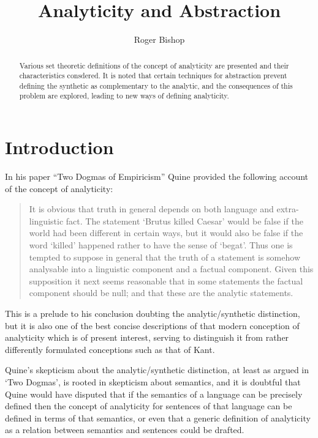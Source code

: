 \documentclass{rbjk}
\begin{document}
                                                                                   
\begin{article}
\begin{opening}  
\title{Analyticity and Abstraction}
\author{Roger Bishop }

\begin{abstract}
Various set theoretic definitions of the concept of analyticity are presented and their characteristics consdered.
It is noted that certain techniques for abstraction prevent defining
the synthetic as complementary to the analytic, and the consequences of this problem are explored, leading to new ways of defining analyticity.
\end{abstract}
\end{opening}

\section{Introduction}

In his paper ``Two Dogmas of Empiricism'' \cite{Quine53} Quine provided the following account of the concept of analyticity:

\begin{quote}
 It is obvious that truth in general depends on both language and extra-linguistic fact. The statement `Brutus killed Caesar' would be false if the world had been different in certain ways, but it would also be false if the word `killed' happened rather to have the sense of `begat'. Thus one is tempted to suppose in general that the truth of a statement is somehow analysable into a linguistic component and a factual component.
 Given this supposition it next seems reasonable that in some statements the factual component should be null; and that these are the analytic statements.
\end{quote}

This is a prelude to his conclusion doubting the analytic/synthetic distinction, but it is also one of the best concise descriptions of that modern conception of analyticity which is of present interest, serving to distinguish it from rather differently formulated conceptions such as that of Kant.

Quine's skepticism about the analytic/synthetic distinction, at least as argued in `Two Dogmas', is rooted in skepticism about semantics, and it is doubtful that Quine would have disputed that if the semantics of a language can be precisely defined then the concept of analyticity for sentences of that language can be defined in terms of that semantics, or even that a generic definition of analyticity as a relation between semantics and sentences could be drafted.


\end{article}
\end{document}
